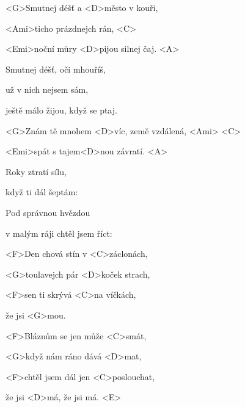 

\zs
<G>Smutnej déšť a <D>město v kouři,

<Ami>ticho prázdnejch rán, <C>

<Emi>noční můry <D>pijou silnej čaj. <A>
\ks

\zs
Smutnej déšť, oči mhouříš,

už v nich nejsem sám,

ještě málo žijou, když se ptaj.
\ks

\zr
<G>Znám tě mnohem <D>víc, země vzdálená, <Ami> <C>

<Emi>spát s tajem<D>nou závratí. <A>
\kr

\zs
Roky ztratí sílu,

když ti dál šeptám:

\ks

\zs
Pod správnou hvězdou

v malým ráji chtěl jsem říct:

\ks

\zs
<F>Den chová stín v <C>záclonách,

<G>toulavejch pár <D>koček strach,

<F>sen ti skrývá <C>na víčkách,

že jsi <G>mou.
\ks

\zs
<F>Bláznům se jen může <C>smát,

<G>když nám ráno dává <D>mat,

<F>chtěl jsem dál jen <C>poslouchat,

že jsi <D>má, že jsi má. <E>
\ks

\zr
\kr

\kp






















